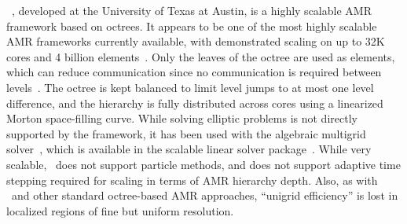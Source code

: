 \documentclass[11pt,letterpaper]{article}
\begin{document}
\SUBSUBSECTION{\alps}
%
\alps~\cite{BuBu09}, developed at the University of Texas at Austin,
is a highly scalable AMR framework based on octrees.  It appears to be
one of the most highly scalable AMR frameworks currently available,
with demonstrated scaling on up to 32K cores and 4 billion
elements~\cite{BuGh08}.
%
Only the leaves of the octree are
used as elements, which can reduce communication since no
communication is required between levels~\cite{BuGh08b}.  The octree
is kept balanced to limit level jumps to at most one level difference,
and the hierarchy is fully distributed across cores using a linearized
Morton space-filling curve.  While solving elliptic problems is not
directly supported by the framework, it has been used with the
 algebraic multigrid solver~\cite{HeYa02}, which is
available in the  scalable linear solver
package~\cite{FaJo06}.
%
%
While very scalable, \alps\ does not support particle methods, and
does not support adaptive time stepping required for scaling in terms
of AMR hierarchy depth.
Also, as with \paramesh\ and other standard octree-based AMR
approaches, ``unigrid efficiency'' is lost in localized regions of
fine but uniform resolution.

\end{document}
